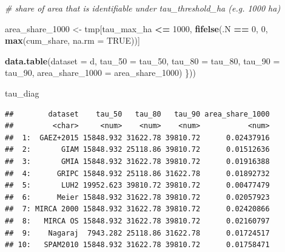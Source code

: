 \documentclass[
  11pt,
]{article}
\newenvironment{Shaded}{\begin{snugshade}}{\end{snugshade}}
\newcommand{\AttributeTok}[1]{\textcolor[rgb]{0.13,0.29,0.53}{#1}}
\newcommand{\CommentTok}[1]{\textcolor[rgb]{0.56,0.35,0.01}{\textit{#1}}}
\newcommand{\ConstantTok}[1]{\textcolor[rgb]{0.56,0.35,0.01}{#1}}
\newcommand{\DecValTok}[1]{\textcolor[rgb]{0.00,0.00,0.81}{#1}}
\newcommand{\FunctionTok}[1]{\textcolor[rgb]{0.13,0.29,0.53}{\textbf{#1}}}
\newcommand{\NormalTok}[1]{#1}
\newcommand{\OtherTok}[1]{\textcolor[rgb]{0.56,0.35,0.01}{#1}}
\newcommand{\SpecialCharTok}[1]{\textcolor[rgb]{0.81,0.36,0.00}{\textbf{#1}}}
\begin{document}
\begin{Shaded}
\begin{Highlighting}[]
\CommentTok{\# share of area that is identifiable under tau\_threshold\_ha (e.g. 1000 ha)}
  
\NormalTok{  area\_share\_1000 }\OtherTok{\textless{}{-}}\NormalTok{ tmp[tau\_max\_ha }\SpecialCharTok{\textless{}=} \DecValTok{1000}\NormalTok{, }\FunctionTok{fifelse}\NormalTok{(.N }\SpecialCharTok{==} \DecValTok{0}\NormalTok{, }\DecValTok{0}\NormalTok{, }
                                                     \FunctionTok{max}\NormalTok{(cum\_share, }\AttributeTok{na.rm =} \ConstantTok{TRUE}\NormalTok{))]}

  \FunctionTok{data.table}\NormalTok{(}\AttributeTok{dataset =}\NormalTok{ d,}
             \AttributeTok{tau\_50 =}\NormalTok{ tau\_50,}
             \AttributeTok{tau\_80 =}\NormalTok{ tau\_80,}
             \AttributeTok{tau\_90 =}\NormalTok{ tau\_90,}
             \AttributeTok{area\_share\_1000 =}\NormalTok{ area\_share\_1000)}
\NormalTok{\}))}

\NormalTok{tau\_diag}
\end{Highlighting}
\end{Shaded}

\begin{verbatim}
##        dataset    tau_50   tau_80   tau_90 area_share_1000
##         <char>     <num>    <num>    <num>           <num>
##  1:  GAEZ+2015 15848.932 31622.78 39810.72      0.02437916
##  2:       GIAM 15848.932 25118.86 39810.72      0.01512636
##  3:       GMIA 15848.932 31622.78 39810.72      0.01916388
##  4:      GRIPC 15848.932 25118.86 31622.78      0.01892732
##  5:       LUH2 19952.623 39810.72 39810.72      0.00477479
##  6:      Meier 15848.932 31622.78 39810.72      0.02057923
##  7: MIRCA 2000 15848.932 31622.78 39810.72      0.02420866
##  8:   MIRCA OS 15848.932 31622.78 39810.72      0.02160797
##  9:    Nagaraj  7943.282 25118.86 31622.78      0.01724517
## 10:   SPAM2010 15848.932 31622.78 39810.72      0.01758471
\end{verbatim}
\end{document}
